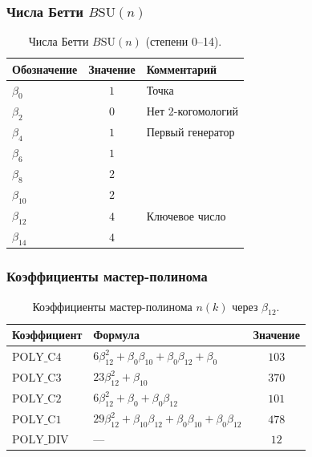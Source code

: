 \documentclass[11pt,a4paper]{article}
\newcommand{\SU}{\ensuremath{\mathrm{SU}}}
\theoremstyle{definition}
\begin{document}
\subsubsection{Числа Бетти \texorpdfstring{$B\SU(n)$}{B(n)}}

\begin{table}[ht]
\centering
\caption{Числа Бетти \texorpdfstring{$B\SU(n)$}{B(n)} (степени 0–14).}
\label{tab:app-betti}
\begin{tabular}{lcl}
\toprule
Обозначение & Значение & Комментарий \\
\midrule
$\beta_0$  & $1$ & Точка \\
$\beta_2$  & $0$ & Нет 2-когомологий \\
$\beta_4$  & $1$ & Первый генератор \\
$\beta_6$  & $1$ & \\
$\beta_8$  & $2$ & \\
$\beta_{10}$ & $2$ & \\
$\beta_{12}$ & $4$ & Ключевое число \\
$\beta_{14}$ & $4$ & \\
\bottomrule
\end{tabular}
\end{table}

\subsubsection{Коэффициенты мастер-полинома}

\begin{table}[ht]
\centering
\caption{Коэффициенты мастер-полинома \texorpdfstring{$n(k)$}{n(k)} через \texorpdfstring{$\beta_{12}$}{\_12}.}
\label{tab:app-poly-coeffs}
\begin{tabular}{llc}
\toprule
Коэффициент & Формула & Значение \\
\midrule
$\text{POLY\_C4}$ & $6\beta_{12}^2 + \beta_0\beta_{10} + \beta_0\beta_{12} + \beta_0$ & $103$ \\
$\text{POLY\_C3}$ & $23\beta_{12}^2 + \beta_{10}$ & $370$ \\
$\text{POLY\_C2}$ & $6\beta_{12}^2 + \beta_0 + \beta_0\beta_{12}$ & $101$ \\
$\text{POLY\_C1}$ & $29\beta_{12}^2 + \beta_{10}\beta_{12} + \beta_0\beta_{10} + \beta_0\beta_{12}$ & $478$ \\
$\text{POLY\_DIV}$ & — & $12$ \\
\bottomrule
\end{tabular}
\end{table}
\end{document}
